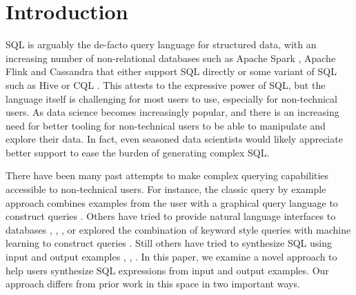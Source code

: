 \section{Introduction}

SQL is arguably the de-facto query language for structured data, with an increasing number of non-relational databases such as Apache Spark \cite{Apache_Spark}, Apache Flink \cite{Apache_Flink} and Cassandra \cite{Cassandra} that either support SQL directly or some variant of SQL such as Hive \cite{Hive} or CQL \cite{CQL}. This attests to the expressive power of SQL, but the language itself is challenging for most users to use, especially for non-technical users.  As data science becomes increasingly popular, and there is an increasing need for better tooling for non-technical users to be able to manipulate and explore their data.  In fact, even seasoned data scientists would likely appreciate better support to ease the burden of generating complex SQL.

There have been many past attempts to make complex querying capabilities accessible to non-technical users.  For instance, the classic query by example approach combines examples from the user with a graphical query language to construct queries \cite{Zloof}.  Others have tried to provide natural language interfaces to databases \cite{Fei-Li}, \cite{Androutsopoulos}, \cite{Seq2SQL}, or explored the combination of keyword style queries with machine learning to construct queries \cite{Bergamaschi}.  Still others have tried to synthesize SQL using input and output examples \cite{BodikPLDI}, \cite{BodikSIGMOD}, \cite{Zhang}.  In this paper, we examine a novel approach to help users synthesize SQL expressions from input and output examples.  Our approach differs from prior work in this space in two important ways.

